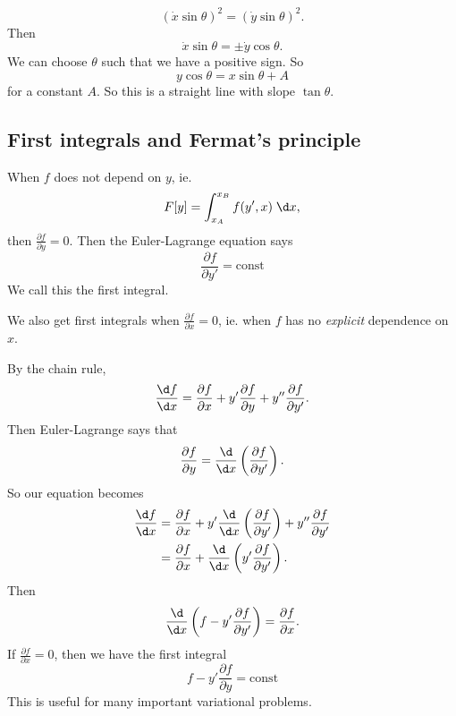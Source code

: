 \documentclass[a4paper]{article}
\begin{document}
\begin{eg}
\begin{enumerate}
      \[
        (\dot x \sin \theta)^2 = (\dot y\sin \theta)^2.
      \]
      Then
      \[
        \dot x \sin \theta = \pm\dot y \cos \theta.
      \]
      We can choose $\theta$ such that we have a positive sign. So
      \[
        y\cos \theta = x\sin \theta + A
      \]
      for a constant $A$. So this is a straight line with slope $\tan \theta$.
  \end{enumerate}
\end{eg}
\subsection{First integrals and Fermat's principle}
When $f$ does not depend on $y$, ie.
\[
  F[y] = \int_{x_A}^{x_B} f(y', x)\;\d x,
\]
then $\frac{\partial f}{\partial y} = 0$. Then the Euler-Lagrange equation says
\[
  \frac{\partial f}{\partial y'} = \text{const}
\]
We call this the first integral.

We also get first integrals when $\frac{\partial f}{\partial x} = 0$, ie. when $f$ has no \emph{explicit} dependence on $x$.

By the chain rule,
\[
  \frac{\d f}{\d x} = \frac{\partial f}{\partial x} + y' \frac{\partial f}{\partial y} + y'' \frac{\partial f}{\partial y'}.
\]
Then Euler-Lagrange says that
\[
  \frac{\partial f}{\partial y} = \frac{\d}{\d x} \left(\frac{\partial f}{\partial y'}\right).
\]
So our equation becomes
\begin{align*}
  \frac{\d f}{\d x} &= \frac{\partial f}{\partial x} + y' \frac{\d}{\d x}\left(\frac{\partial f}{\partial y'}\right) + y''\frac{\partial f}{\partial y'}\\
  &= \frac{\partial f}{\partial x} + \frac{\d}{\d x}\left(y'\frac{\partial f}{\partial y'}\right).
\end{align*}
Then
\[
  \frac{\d}{\d x}\left(f - y'\frac{\partial f}{\partial y'}\right) = \frac{\partial f}{\partial x}.
\]
If $\frac{\partial f}{\partial x} = 0$, then we have the first integral
\[
  f - y'\frac{\partial f}{\partial y} = \text{const}
\]
This is useful for many important variational problems.
\end{document}
